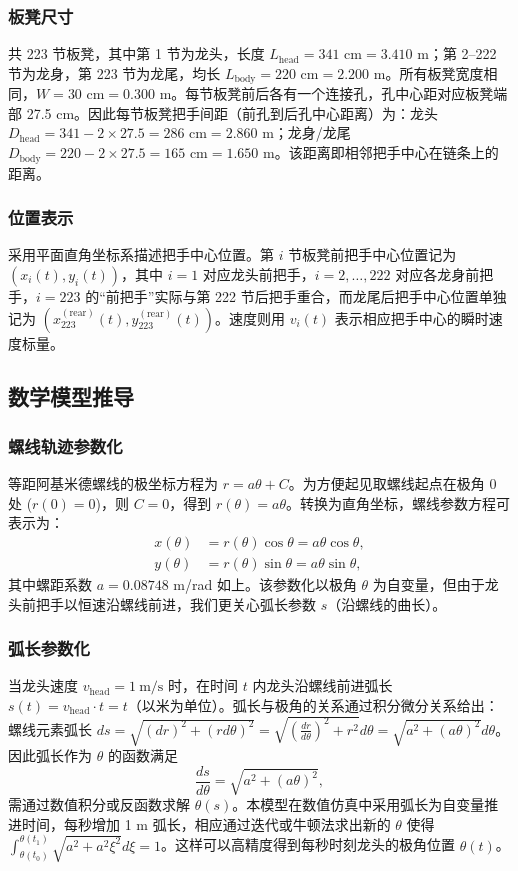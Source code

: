 \documentclass[UTF8]{ctexart}
\begin{document}
\subsubsection{板凳尺寸}
共 223 节板凳，其中第 1 节为龙头，长度 $L_{\text{head}}=341\text{ cm}=3.410\text{ m}$；第 2–222 节为龙身，第 223 节为龙尾，均长 $L_{\text{body}}=220\text{ cm}=2.200\text{ m}$。所有板凳宽度相同，$W=30\text{ cm}=0.300\text{ m}$。每节板凳前后各有一个连接孔，孔中心距对应板凳端部 27.5 cm。因此每节板凳把手间距（前孔到后孔中心距离）为：龙头 $D_{\text{head}}=341-2\times27.5=286\text{ cm}=2.860\text{ m}$；龙身/龙尾 $D_{\text{body}}=220-2\times27.5=165\text{ cm}=1.650\text{ m}$。该距离即相邻把手中心在链条上的距离。

\subsubsection{位置表示}
采用平面直角坐标系描述把手中心位置。第 $i$ 节板凳前把手中心位置记为 $(x_i(t), y_i(t))$，其中 $i=1$ 对应龙头前把手，$i=2,\dots,222$ 对应各龙身前把手，$i=223$ 的“前把手”实际与第 222 节后把手重合，而龙尾后把手中心位置单独记为 $(x_{223}^{(\text{rear})}(t), y_{223}^{(\text{rear})}(t))$。速度则用 $v_i(t)$ 表示相应把手中心的瞬时速度标量。

\subsection{数学模型推导}

\subsubsection{螺线轨迹参数化}
等距阿基米德螺线的极坐标方程为 $r=a\theta+C$。为方便起见取螺线起点在极角 0 处 ($r(0)=0$)，则 $C=0$，得到 $r(\theta)=a\theta$。转换为直角坐标，螺线参数方程可表示为：
\begin{align*}
x(\theta) &= r(\theta)\cos\theta = a\theta\cos\theta, \\
y(\theta) &= r(\theta)\sin\theta = a\theta\sin\theta,
\end{align*}
其中螺距系数 $a=0.08748$ m/rad 如上。该参数化以极角 $\theta$ 为自变量，但由于龙头前把手以恒速沿螺线前进，我们更关心弧长参数 $s$（沿螺线的曲长）。
\subsubsection{弧长参数化}
当龙头速度 $v_{\text{head}}=1\ \text{m/s}$ 时，在时间 $t$ 内龙头沿螺线前进弧长 $s(t)=v_{\text{head}} \cdot t=t$（以米为单位）。弧长与极角的关系通过积分微分关系给出：螺线元素弧长 $ds=\sqrt{(dr)^2+(r d\theta)^2} = \sqrt{(\frac{dr}{d\theta})^2 + r^2}d\theta = \sqrt{a^2 + (a\theta)^2}d\theta$。因此弧长作为 $\theta$ 的函数满足
\[
\frac{ds}{d\theta}=\sqrt{a^2 + (a\theta)^2},
\]
需通过数值积分或反函数求解 $\theta(s)$。本模型在数值仿真中采用弧长为自变量推进时间，每秒增加 1 m 弧长，相应通过迭代或牛顿法求出新的 $\theta$ 使得 $\int_{\theta(t_0)}^{\theta(t_1)}\sqrt{a^2+a^2\xi^2}d\xi = 1$。这样可以高精度得到每秒时刻龙头的极角位置 $\theta(t)$。
\end{document}
